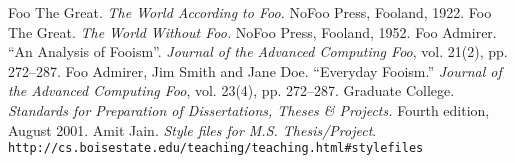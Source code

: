 \documentclass{bsu-ms}
\begin{document}
%
%





%
%



\begin{thebibliography}{99} 
\label{references}
 Foo The Great. {\em The World According to Foo.} NoFoo
Press, Fooland, 1922.
 Foo The Great. {\em The World Without Foo.} NoFoo
Press, Fooland, 1952.
 Foo Admirer. ``An Analysis of Fooism''. {\em Journal of the
Advanced Computing Foo}, vol. 21(2), pp. 272--287.
 Foo Admirer, Jim Smith and Jane Doe. ``Everyday
Fooism.'' {\em Journal of the Advanced Computing Foo}, vol. 23(4),
pp. 272--287.
 Graduate College. {\em Standards for Preparation of Dissertations, Theses \&
Projects.} Fourth edition, August 2001.
 Amit Jain. {\em Style files for M.S. Thesis/Project}.\\ \texttt{http://cs.boisestate.edu/teaching/teaching.html\#stylefiles}
\end{thebibliography}


%
%


\appendix

\end{document}
